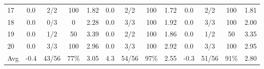 \begin{table}[p]
{\begin{tabular}{l|cccc|cccc|cccc}
17 & 0.0 & 2/2 & 100 & 1.82 & 0.0 & 2/2 & 100 & 1.72 & 0.0 & 2/2 & 100 & 1.81 \\
18 & 0.0 & 0/3 & 0 & 2.28 & 0.0 & 3/3 & 100 & 1.92 & 0.0 & 3/3 & 100 & 2.00 \\
19 & 0.0 & 1/2 & 50 & 3.39 & 0.0 & 2/2 & 100 & 1.86 & 0.0 & 1/2 & 50 & 3.35 \\
20 & 0.0 & 3/3 & 100 & 2.96 & 0.0 & 3/3 & 100 & 2.92 & 0.0 & 3/3 & 100 & 2.95 \\
\midrule
Avg & -0.4 & 43/56 & 77\% & 3.05 & 4.3 & 54/56 & 97\% & 2.55 & -0.3 & 51/56 & 91\% & 2.80 \\
\bottomrule
\end{tabular}%
}
\end{table}
